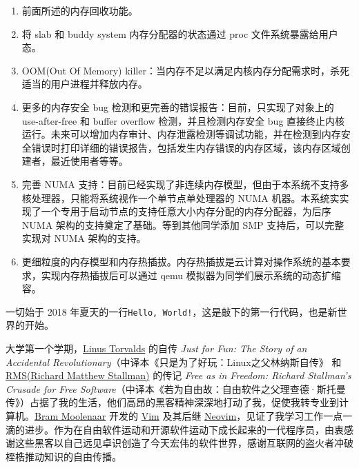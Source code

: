 \documentclass[AutoFakeBold]{LZUThesis}
\begin{document}
\begin{sloppypar}
\begin{enumerate}
\def\labelenumi{\arabic{enumi}.}
\item
  前面所述的内存回收功能。
\item
  将 slab 和 buddy system 内存分配器的状态通过 proc 文件系统暴露给用户态。
\item
  OOM(Out Of Memory)
  killer：当内存不足以满足内核内存分配需求时，杀死适当的用户进程并释放内存。
\item
  更多的内存安全 bug 检测和更完善的错误报告：目前，只实现了对象上的
  use-after-free 和 buffer overflow 检测，并且检测内存安全 bug
  直接终止内核运行。未来可以增加内存审计、内存泄露检测等调试功能，并在检测到内存安全错误时打印详细的错误报告，包括发生内存错误的内存区域，该内存区域创建者，最近使用者等等。
\item
  完善 NUMA
  支持：目前已经实现了非连续内存模型，但由于本系统不支持多核处理器，只能将系统视作一个单节点单处理器的
  NUMA
  机器。本系统实实现了一个专用于启动节点的支持任意大小内存分配的内存分配器，为后序
  NUMA 架构的支持奠定了基础。等到其他同学添加 SMP 支持后，可以完整实现对
  NUMA 架构的支持。
\item
  更细粒度的内存模型和内存热插拔。内存热插拔是云计算对操作系统的基本要求，实现内存热插拔后可以通过
  qemu 模拟器为同学们展示系统的动态扩缩容。
\end{enumerate}





\backmatter


\printbib
\nocite{*} %






\Thanks

一切始于 2018 年夏天的一行\texttt{Hello, World!}，这是敲下的第一行代码，也是新世界的开始。

大学第一个学期，\hyperlink{https://linuxtorvalds.com/}{Linus Torvalds} 的自传 \textit{Just for Fun: The Story of an Accidental Revolutionary}（中译本《只是为了好玩：Linux之父林纳斯自传》 和 \hyperlink{https://stallman.org/}{RMS(Richard Matthew Stallman)} 的传记 \textit{Free as in Freedom: Richard Stallman's Crusade for Free Software}（中译本《若为自由故：自由软件之父理查德·斯托曼传》）占据了我的生活，他们高昂的黑客精神深深地打动了我，促使我转专业到计算机。\hyperlink{https://www.moolenaar.net/}{Bram Moolenaar} 开发的 \hyperlink{https://www.vim.org/}{Vim} 及其后继 \hyperlink{https://neovim.io/}{Neovim}，见证了我学习工作一点一滴的进步。作为在自由软件运动和开源软件运动下成长起来的一代程序员，由衷感谢这些黑客以自己远见卓识创造了今天宏伟的软件世界，感谢互联网的盗火者冲破桎梏推动知识的自由传播。


\end{sloppypar}
\end{document}
